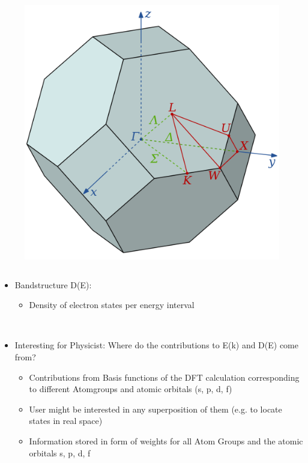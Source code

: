 \begin{frame}
\begin{column}{.5\textwidth}
\end{column}
\begin{column}{.5\textwidth}
\begin{figure}
   \includegraphics[width=0.7\linewidth]{fig/Brillouin_Zone_(1st,_FCC).png}
\end{figure}

\end{column}



\end{frame}

\begin{frame}
\begin{itemize}
\item Bandstructure D(E):
\begin{itemize}
    \item Density of electron states per energy interval %
\end{itemize}

\
\item Interesting for Physicist: Where do the contributions to E(k) and D(E) come from?
\begin{itemize}
\item Contributions from Basis functions of the DFT calculation corresponding to different Atomgroups and atomic orbitals (s, p, d, f)
\item User might be interested in any superposition of them (e.g. to locate states in real space)
\item Information stored in form of weights for all Atom Groups and the atomic orbitals s, p, d, f 
\end{itemize}

\end{itemize}
\end{frame}